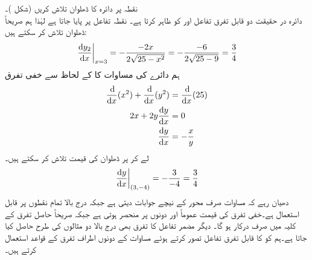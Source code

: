 نقطہ  پر دائرہ  کا ڈھلوان تلاش کریں (شکل )۔\\
دائرہ در حقیقت دو قابل تفرق تفاعل  اور  کو ظاہر کرتا ہے۔ نقطہ  تفاعل  پر پایا جاتا ہے لہٰذا ہم صریحاً ڈھلوان تلاش کر سکتے ہیں:
\begin{align}\label{مساوات_تفرق_دائرہ_نچلا}
\left. \frac{\dif y_2}{\dif x}\right|_{x=3}=-\frac{-2x}{2\sqrt{25-x^2}}=-\frac{-6}{2\sqrt{25-9}}=\frac{3}{4}
\end{align}
ہم دائرے کی مساوات کا  کے لحاظ سے خفی تفرق
\begin{align*}
\frac{\dif}{\dif x}(x^2)+\frac{\dif }{\dif x}(y^2)&=\frac{\dif}{\dif x}(25)\\
2x+2y\frac{\dif y}{\dif x}&=0\\
\frac{\dif y}{\dif x}&=-\frac{x}{y}
\end{align*}
لے کر  پر ڈھلوان کی قیمت تلاش کر سکتے ہیں۔
\begin{align*}
\left. \frac{\dif y}{\dif x}\right|_{(3,-4)}=-\frac{3}{-4}=\frac{3}{4}
\end{align*}
دھیان رہے کہ مساوات  صرف محور  کے نیچے جوابات دیتی ہے جبکہ درج بالا تمام نقطوں پر قابل استعمال ہے۔خفی تفرق کی قیمت عموماً  اور  دونوں پر منحصر ہوتی ہے جبکہ صریحاً حاصل تفرق کے کلیہ میں صرف  درکار ہو گا۔
دیگر مضمر تفاعل کا تفرق بھی درج بالا دو مثالوں کی طرح حاصل کیا جاتا ہے۔ہم  کو  کا قابل تفرق تفاعل تصور کرتے ہوئے مساوات کے دونوں اطراف تفرق کے قواعد استعمال کرتے ہیں۔

